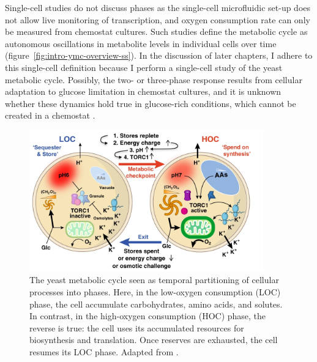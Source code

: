 Single-cell studies \parencite{papagiannakisAutonomousMetabolicOscillations2017, baumgartnerFlavinbasedMetabolicCycles2018} do not discuss phases as the single-cell microfluidic set-up does not allow live monitoring of transcription, and oxygen consumption rate can only be measured from chemostat cultures.
Such studies define the metabolic cycle as autonomous oscillations in metabolite levels in individual cells over time (figure~\ref{fig:intro-ymc-overview-ss}).
In the discussion of later chapters, I adhere to this single-cell definition because I perform a single-cell study of the yeast metabolic cycle.
Possibly, the two- or three-phase response results from cellular adaptation to glucose limitation in chemostat cultures, and it is unknown whether these dynamics hold true in glucose-rich conditions, which cannot be created in a chemostat \parencite{slavovCouplingGrowthRate2011}.

\begin{figure}
  \centering
  \includegraphics[width=0.9\textwidth]{oneillEukaryoticCellBiology2020_3a_adapted}
  \caption{
    The yeast metabolic cycle seen as temporal partitioning of cellular processes into phases.
    Here, in the low-oxygen consumption (LOC) phase, the cell accumulate carbohydrates, amino acids, and solutes.
    In contrast, in the high-oxygen consumption (HOC) phase, the reverse is true:
    the cell uses its accumulated resources for biosynthesis and translation.
    Once reserves are exhausted, the cell resumes its LOC phase.
    Adapted from \textcite{oneillEukaryoticCellBiology2020}.}
  \label{fig:intro-ymc-overview-oneill}
\end{figure}

